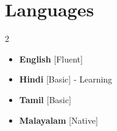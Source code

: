 \documentclass[11pt,a4paper,sans]{moderncv}
\makeatletter
\newcommand*{\customcventry}[7][0.13em]{
  \begin{tabular}{@{}l}
    {\bfseries #4} \
    {\itshape #3}
  \end{tabular}
  \hfill
  \begin{tabular}{l@{}}
    {\bfseries #5} \
    {\itshape #2}
  \end{tabular}
  \ifx&#7&
  \else{\
    \begin{minipage}{\maincolumnwidth}
      \small#7
  \end{minipage}}\fi
  \par\addvspace{#1}
}
\newcommand*{\customcvproject}[4][.25em]{
  \begin{tabular}{@{}l}
    {\bfseries #2}
  \end{tabular}
  \hfill
  \begin{tabular}{l@{}}
    {\itshape #3}
  \end{tabular}
  \ifx&#4&
  \else{\\
    \begin{minipage}{\maincolumnwidth}
      \small#4
  \end{minipage}}\fi
  \par\addvspace{#1}
}
\makeatother
\begin{document}




\section{Languages}
\begin{multicols}{2}
  \begin{itemize}[label=\textbullet]
    \item \textbf{English} [Fluent]
    \item {\textbf{Hindi} [Basic] - Learning}
    \item {\textbf{Tamil} [Basic]}
    \item {\textbf{Malayalam} [Native]}
  \end{itemize}
\end{multicols}
\end{document}
